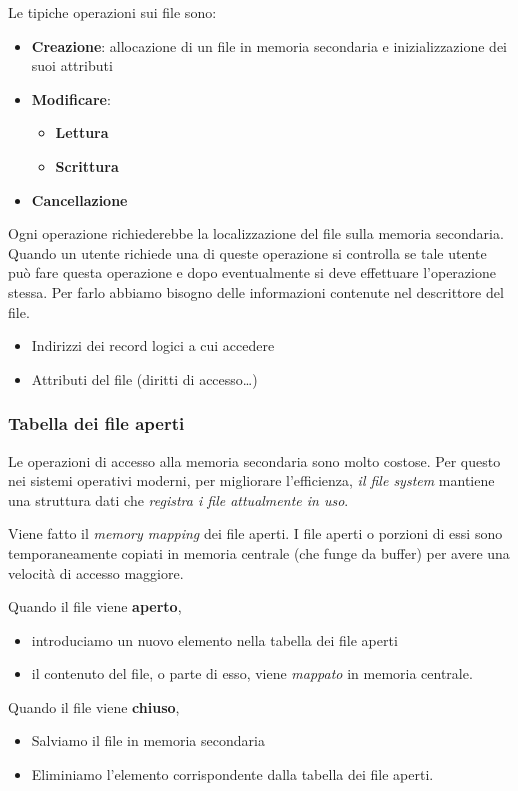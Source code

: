 \documentclass
[10pt,        %
 a4paper,     %
 onecolumn,   %
 fleqn,       %
 oneside,     %
 notitlepage, %
]{article}    %
\begin{document}
Le tipiche operazioni sui file sono:
\begin{itemize}
    \item \textbf{Creazione}: allocazione di un file in memoria secondaria e inizializzazione dei suoi attributi
    \item \textbf{Modificare}:
    \begin{itemize}
        \item \textbf{Lettura}
        \item \textbf{Scrittura}
    \end{itemize}
    \item \textbf{Cancellazione}
\end{itemize}

Ogni operazione richiederebbe la localizzazione del file sulla memoria secondaria. Quando un utente richiede una di queste operazione si controlla se tale utente può fare questa operazione e dopo eventualmente si deve effettuare l'operazione stessa. Per farlo abbiamo bisogno delle informazioni contenute nel descrittore del file.
\begin{itemize}
    \item Indirizzi dei record logici a cui accedere
    \item Attributi del file (diritti di accesso\ldots)
\end{itemize}

\subsubsection{Tabella dei file aperti}
Le operazioni di accesso alla memoria secondaria sono molto costose. Per questo nei sistemi operativi moderni, per migliorare l'efficienza, \textit{il file system} mantiene una struttura dati che \textit{registra i file attualmente in uso}.

Viene fatto il \textit{memory mapping} dei file aperti. I file aperti o porzioni di essi sono temporaneamente copiati in memoria centrale (che funge da buffer) per avere una velocità di accesso maggiore.

Quando il file viene \textbf{aperto},
\begin{itemize}
    \item introduciamo un nuovo elemento nella tabella dei file aperti
    \item il contenuto del file, o parte di esso, viene \textit{mappato} in memoria centrale.
\end{itemize} 

Quando il file viene \textbf{chiuso},
\begin{itemize}
    \item Salviamo il file in memoria secondaria
    \item Eliminiamo l'elemento corrispondente dalla tabella dei file aperti. 
\end{itemize}
\end{document}
